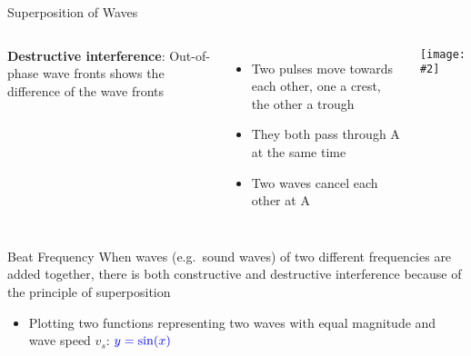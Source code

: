\documentclass[12pt,aspectratio=169]{beamer}
\newcommand{\pic}[2]{\texttt{[image: \#2]}}
\begin{document}
\begin{frame}{Superposition of Waves}
  \begin{columns}
    \textbf{Destructive interference}: Out-of-phase wave fronts shows the
    difference of the wave fronts
    \begin{itemize}
    \item Two pulses move towards each other, one a crest, the other a trough
    \item They both pass through A at the same time
    \item Two waves cancel each other at A
    \end{itemize}
        
    \pic{1}{destructive.png}
  \end{columns}
\end{frame}


\begin{frame}{Beat Frequency}
  When waves (e.g.\ sound waves) of two different frequencies are added
  together, there is both constructive and destructive interference because of
  the principle of superposition
  \begin{itemize}
  \item Plotting two functions representing two waves with equal magnitude
    and wave speed $v_s$: $\color{blue}{y=\sin(x)}$
  \end{itemize}
  \begin{center}
    \vspace{-.1in}
  \end{center}
\end{frame}
\end{document}
